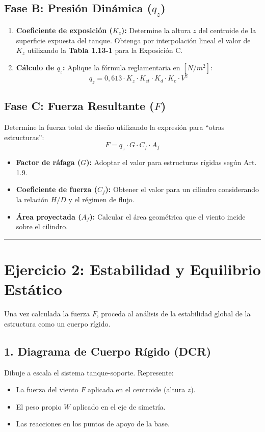 \documentclass[11pt,a4paper]{article}
\newcommand{\linea}{\vspace{0.5cm} \hrule \vspace{0.5cm}}
\begin{document}
\subsection*{Fase B: Presión Dinámica ($q_z$)}
\begin{enumerate}
    \item \textbf{Coeficiente de exposición ($K_z$):} Determine la altura $z$ del centroide de la superficie expuesta del tanque. Obtenga por interpolación lineal el valor de $K_z$ utilizando la \textbf{Tabla 1.13-1} para la Exposición C.
    \item \textbf{Cálculo de $q_z$:} Aplique la fórmula reglamentaria en $[N/m^2]$:
    \[ q_z = 0,613 \cdot K_z \cdot K_{zt} \cdot K_d \cdot K_e \cdot V^2 \]
\end{enumerate}

\subsection*{Fase C: Fuerza Resultante ($F$)}
Determine la fuerza total de diseño utilizando la expresión para ``otras estructuras'':
\[ F = q_z \cdot G \cdot C_f \cdot A_f \]
\begin{itemize}
    \item \textbf{Factor de ráfaga ($G$):} Adoptar el valor para estructuras rígidas según Art. 1.9.
    \item \textbf{Coeficiente de fuerza ($C_f$):} Obtener el valor para un cilindro considerando la relación $H/D$ y el régimen de flujo.
    \item \textbf{Área proyectada ($A_f$):} Calcular el área geométrica que el viento incide sobre el cilindro.
\end{itemize}

\linea

\section*{Ejercicio 2: Estabilidad y Equilibrio Estático}

Una vez calculada la fuerza $F$, proceda al análisis de la estabilidad global de la estructura como un cuerpo rígido.

\subsection*{1. Diagrama de Cuerpo Rígido (DCR)}
Dibuje a escala el sistema tanque-soporte. Represente:
\begin{itemize}
    \item La fuerza del viento $F$ aplicada en el centroide (altura $z$).
    \item El peso propio $W$ aplicado en el eje de simetría.
    \item Las reacciones en los puntos de apoyo de la base.
\end{itemize}
\end{document}

